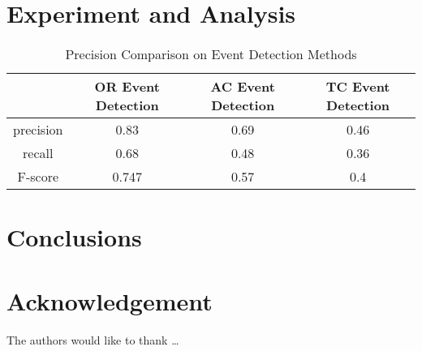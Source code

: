 \qwuMarker %

\section{Experiment and Analysis} \label{sec-experiment}


\begin{table}  \centering
  \caption{Precision Comparison on Event Detection Methods}
  \label{tbl:overall-experiments}
  \begin{tabular}{cccc}
\toprule
    & OR Event Detection & AC Event Detection & TC Event Detection \\
\midrule
    precision & 0.83 & 0.69 & 0.46 \\
    recall & 0.68 & 0.48 & 0.36 \\
    F-score & 0.747 & 0.57 & 0.4 \\
\bottomrule
\end{tabular}
\end{table}


\section{Conclusions} \label{sec-conclusions}

\blindtext

\section*{Acknowledgement}

\lipsum[1]


The authors would like to thank \ldots

